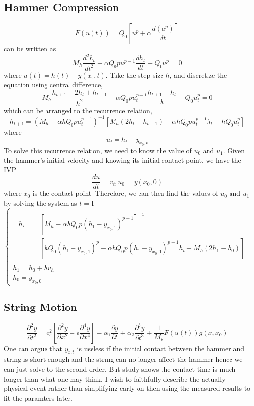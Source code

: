 \documentclass[a4paper,12pt]{article}
\begin{document}
\subsection*{Hammer Compression}
		\[ F(u(t)) = Q_0 [u^p + \alpha \frac{d(u^p)}{dt}] \]
		can be written as
		\[ M_h \frac{d^2 h_t}{dt^2} - 
		   \alpha Q_0 p u^{p-1} \frac{dh_t}{dt} - 
		   Q_0 u^p = 0 \]
		where $ u(t) = h(t) - y(x_0,t)$. Take the step size $h$, and discretize the equation using central difference,
		\[ M_h \frac{h_{t+1} - 2h_t + h_{t-1}}{h^2} -
		   \alpha Q_0 p u_t^{p-1} \frac{h_{t+1} - h_{t}} {h} - 
		   Q_0 u_t^p = 0 \]
		which can be arranged to the recurrence relation,
		\[ h_{t+1} = (M_h - \alpha h Q_0 p u_t^{p-1})^{-1}
		              [M_h(2h_t - h_{t-1}) -
		               \alpha h Q_0 p u_t^{p - 1} h_t +
		               h Q_0 u_t^p] \] 
		where $$u_t = h_t - y_{x_0,t}$$
		To solve this recurrence relation, we need to know the value of $u_0$ and $u_1$. Given the hammer's initial velocity and knowing its initial contact point, we have the IVP
		\[ \frac{du}{dt} = v_t, u_0 = y(x_0, 0) \]	
		where $x_0$ is the contact point.
		Therefore, we can then find the values of $u_0$ and $u_1$ by solving the system as $t = 1$
		\[
		\begin{cases}
			\begin{array}{lcl}
			\begin{aligned}
				h_2 = &[M_h - \alpha h Q_0 p (h_1 - y_{x_0,1})^{p-1}]^{-1} \\
		              & [h Q_0 (h_1 - y_{x_0,1})^p  -
		                 \alpha h Q_0 p (h_1 - y_{x_0,1})^{p - 1} h_t +
		                 M_h(2h_1 - h_0)]
		    \end{aligned}
		    \end{array} \\
				h_1 = h_0 + hv_h \\
				h_0 = y_{x_0,0}
		\end{cases}
		\]
		
\subsection*{String Motion}
		\[ \frac{\partial^2 y}{\partial t^2} = 
	   c_s^2 [\frac{\partial^2 y}{\partial x^2} - \epsilon \frac{\partial^4 y}{\partial x^4}] - 
	   \alpha_1 \frac{\partial y}{\partial t} + 
	   \alpha_2 \frac{\partial^3 y}{\partial t^3} + 
	   \frac{1}{M_h} F(u(t)) g(x,x_0) \]
	   One can argue that $y_{x,t}$ is useless if the initial contact between the hammer and string is short enough and the string can no longer affect the hammer hence we can just solve to the second order. But study shows the contact time is much longer than what one may think. I wish to faithfully describe the actually physical event rather than simplifying early on then using the measured results to fit the paramters later.
	   
\end{document}
